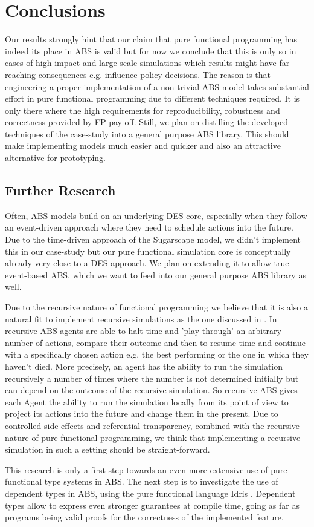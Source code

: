 \section{Conclusions}
\label{sec:conclusions}
Our results strongly hint that our claim that pure functional programming has indeed its place in ABS is valid but for now we conclude that this is only so in cases of high-impact and large-scale simulations which results might have far-reaching consequences e.g. influence policy decisions. The reason is that engineering a proper implementation of a non-trivial ABS model takes substantial effort in pure functional programming due to different techniques required. It is only there where the high requirements for reproducibility, robustness and correctness provided by FP pay off. Still, we plan on distilling the developed techniques of the case-study into a general purpose ABS library. This should make implementing models much easier and quicker and also an attractive alternative for prototyping.

\subsection{Further Research}
Often, ABS models build on an underlying DES core, especially when they follow an event-driven approach \cite{meyer_event-driven_2014} where they need to schedule actions into the future. Due to the time-driven approach of the Sugarscape model, we didn't implement this in our case-study but our pure functional simulation core is conceptually already very close to a DES approach. We plan on extending it to allow true event-based ABS, which we want to feed into our general purpose ABS library as well.

Due to the recursive nature of functional programming we believe that it is also a natural fit to implement recursive simulations as the one discussed in \cite{gilmer_recursive_2000}. In recursive ABS agents are able to halt time and 'play through' an arbitrary number of actions, compare their outcome and then to resume time and continue with a specifically chosen action e.g. the best performing or the one in which they haven't died. More precisely, an agent has the ability to run the simulation recursively a number of times where the number is not determined initially but can depend on the outcome of the recursive simulation. So recursive ABS gives each Agent the ability to run the simulation locally from its point of view to project its actions into the future and change them in the present. Due to controlled side-effects and referential transparency, combined with the recursive nature of pure functional programming, we think that implementing a recursive simulation in such a setting should be straight-forward.

This research is only a first step towards an even more extensive use of pure functional type systems in ABS. The next step is to investigate the use of dependent types in ABS, using the pure functional language Idris \cite{brady_idris_2013}. Dependent types allow to express even stronger guarantees at compile time, going as far as programs being valid proofs for the correctness of the implemented feature.